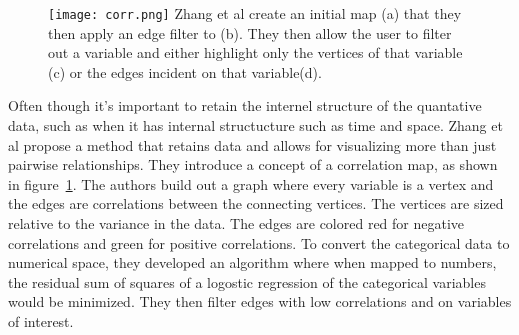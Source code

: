 \documentclass[../main.text]{subfiles}
\begin{document}
\begin{figure}
  \texttt{[image: corr.png]}
  \label{caption} Zhang et al create an initial map (a) that they then apply an
  edge filter to (b). They then allow the user to filter out a variable and
  either highlight only the vertices of that variable (c) or the edges incident
  on that variable(d).
  \label{fig:corr}
\end{figure}

Often though it's important to retain the internel structure of the
quantative data, such as when it has internal structucture such as time and
space. Zhang et al propose a method that retains data and allows for
visualizing more than just pairwise relationships\cite{zhang_visual_2015}. They
introduce a concept of a correlation map, as shown in
figure~\ref{fig:corr}. The authors build out a graph where every variable is a
vertex and the edges are correlations between the connecting vertices. The
vertices are sized relative to the variance in the data. The edges are colored
red for negative correlations and green for positive correlations. To convert
the categorical data to numerical space, they developed an algorithm where when
mapped to numbers, the residual sum of squares of a logostic regression of the
categorical variables  would be minimized. They then filter edges with low
correlations and on variables of interest.
\end{document}

